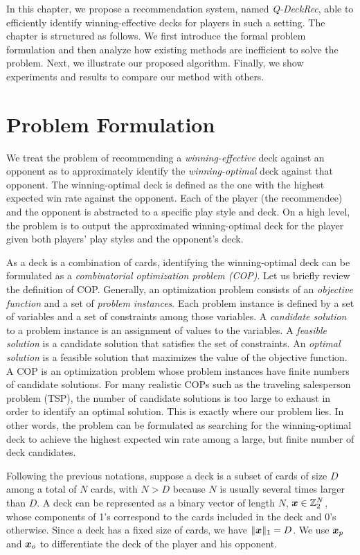 In this chapter, we propose a recommendation system, named \textit{Q-DeckRec}, able to efficiently identify winning-effective decks for players in such a setting. The chapter is structured as follows. We first introduce the formal problem formulation and then analyze how existing methods are inefficient to solve the problem. Next, we illustrate our proposed algorithm. Finally, we show experiments and results to compare our method with others.

 
 \section{Problem Formulation}\label{sec:qdeckrec_probform}
We treat the problem of recommending a \textit{winning-effective} deck against an opponent as to approximately identify the \textit{winning-optimal} deck against that opponent. The winning-optimal deck is defined as the one with the highest expected win rate against the opponent. Each of the player (the recommendee) and the opponent is abstracted to a specific play style and deck. On a high level, the problem is to output the approximated winning-optimal deck for the player given both players' play styles and the opponent's deck.

As a deck is a combination of cards, identifying the winning-optimal deck can be formulated as a \textit{combinatorial optimization problem (COP)}. Let us briefly review the definition of COP. Generally, an optimization problem consists of an \textit{objective function} and a set of \textit{problem instances}. Each problem instance is defined by a set of variables and a set of constraints among those variables. A \textit{candidate solution} to a problem instance is an assignment of values to the variables. A \textit{feasible solution} is a candidate solution that satisfies the set of constraints. An \textit{optimal solution} is a feasible solution that maximizes the value of the objective function. A COP is an optimization problem whose problem instances have finite numbers of candidate solutions. For many realistic COPs such as the traveling salesperson problem (TSP), the number of candidate solutions is too large to exhaust in order to identify an optimal solution. This is exactly where our problem lies. In other words, the problem can be formulated as searching for the winning-optimal deck to achieve the highest expected win rate among a large, but finite number of deck candidates.

Following the previous notations, suppose a deck is a subset of cards of size $D$ among a total of $N$ cards, with $N > D$ because $N$ is usually several times larger than $D$. A deck can be represented as a binary vector of length $N$, $ \boldsymbol{x} \in \mathbb{Z}_2^N$, whose components of 1's correspond to the cards included in the deck and 0's otherwise. Since a deck has a fixed size of cards, we have $\|\boldsymbol{x}\|_1=D$. We use $\boldsymbol{x}_p$ and $\boldsymbol{x}_o$ to differentiate the deck of the player and his opponent. 

